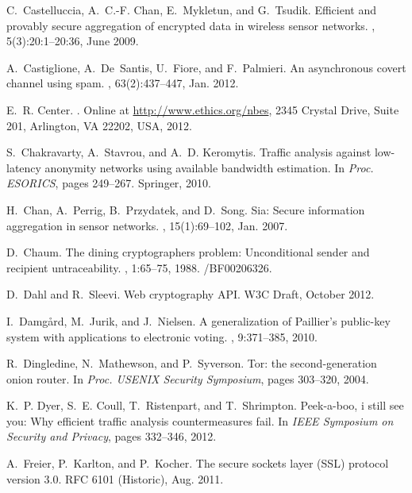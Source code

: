 \documentclass[twocolumn,10pt]{article}
\begin{document}
\begin{thebibliography}{10}
C.~Castelluccia, A.~C.-F. Chan, E.~Mykletun, and G.~Tsudik.
\newblock Efficient and provably secure aggregation of encrypted data in
  wireless sensor networks.
, 5(3):20:1--20:36, June 2009.

A.~Castiglione, A.~De~Santis, U.~Fiore, and F.~Palmieri.
\newblock An asynchronous covert channel using spam.
, 63(2):437--447, Jan. 2012.

E.~R. Center.
.
\newblock Online at \url{http://www.ethics.org/nbes}, 2345 Crystal Drive, Suite
  201, Arlington, VA 22202, USA, 2012.

S.~Chakravarty, A.~Stavrou, and A.~D. Keromytis.
\newblock Traffic analysis against low-latency anonymity networks using
  available bandwidth estimation.
\newblock In {\em Proc. ESORICS}, pages 249--267. Springer, 2010.

H.~Chan, A.~Perrig, B.~Przydatek, and D.~Song.
\newblock Sia: Secure information aggregation in sensor networks.
, 15(1):69--102, Jan. 2007.

D.~Chaum.
\newblock The dining cryptographers problem: Unconditional sender and recipient
  untraceability.
, 1:65--75, 1988.
/BF00206326.

D.~Dahl and R.~Sleevi.
\newblock Web cryptography {API}.
\newblock W3C Draft, October 2012.

I.~Damg\aa{}rd, M.~Jurik, and J.~Nielsen.
\newblock A generalization of {Paillier's} public-key system with applications
  to electronic voting.
, 9:371--385,
  2010.

R.~Dingledine, N.~Mathewson, and P.~Syverson.
\newblock Tor: the second-generation onion router.
\newblock In {\em Proc. USENIX Security Symposium}, pages 303--320, 2004.

K.~P. Dyer, S.~E. Coull, T.~Ristenpart, and T.~Shrimpton.
\newblock Peek-a-boo, i still see you: Why efficient traffic analysis
  countermeasures fail.
\newblock In {\em IEEE Symposium on Security and Privacy}, pages 332--346,
  2012.

A.~Freier, P.~Karlton, and P.~Kocher.
\newblock The secure sockets layer ({SSL}) protocol version 3.0.
\newblock RFC 6101 (Historic), Aug. 2011.


\end{thebibliography}
\end{document}
